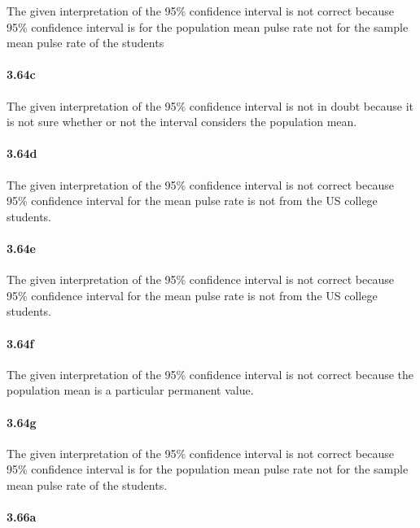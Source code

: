 \documentclass[
]{article}
\begin{document}
The given interpretation of the 95\% confidence interval is not correct
because 95\% confidence interval is for the population mean pulse rate
not for the sample mean pulse rate of the students

\hypertarget{c-5}{%
\paragraph{3.64c}\label{c-5}}

The given interpretation of the 95\% confidence interval is not in doubt
because it is not sure whether or not the interval considers the
population mean.

\hypertarget{d-3}{%
\paragraph{3.64d}\label{d-3}}

The given interpretation of the 95\% confidence interval is not correct
because 95\% confidence interval for the mean pulse rate is not from the
US college students.

\hypertarget{e}{%
\paragraph{3.64e}\label{e}}

The given interpretation of the 95\% confidence interval is not correct
because 95\% confidence interval for the mean pulse rate is not from the
US college students.

\hypertarget{f}{%
\paragraph{3.64f}\label{f}}

The given interpretation of the 95\% confidence interval is not correct
because the population mean is a particular permanent value.

\hypertarget{g}{%
\paragraph{3.64g}\label{g}}

The given interpretation of the 95\% confidence interval is not correct
because 95\% confidence interval is for the population mean pulse rate
not for the sample mean pulse rate of the students.

\hypertarget{a-8}{%
\paragraph{3.66a}\label{a-8}}
\end{document}
